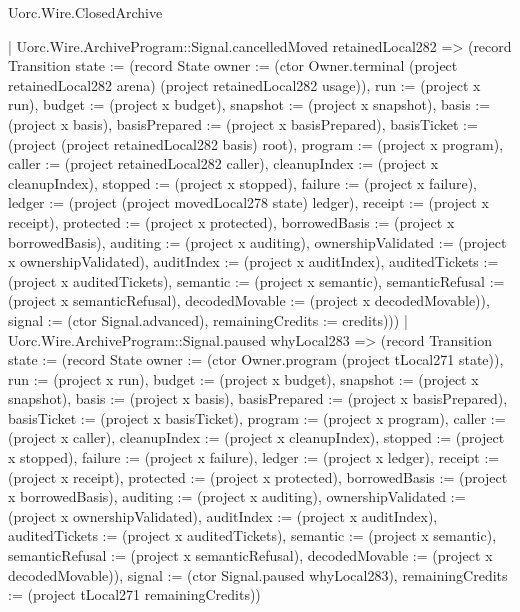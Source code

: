 \begin{lexlean}{Uorc.Wire.ClosedArchive}
\begin{semanticmodule}
{        | Uorc.Wire.ArchiveProgram::Signal.cancelledMoved retainedLocal282 => (record Transition {state := (record State {owner := (ctor Owner.terminal (project retainedLocal282 arena) (project retainedLocal282 usage)), run := (project x run), budget := (project x budget), snapshot := (project x snapshot), basis := (project x basis), basisPrepared := (project x basisPrepared), basisTicket := (project (project retainedLocal282 basis) root), program := (project x program), caller := (project retainedLocal282 caller), cleanupIndex := (project x cleanupIndex), stopped := (project x stopped), failure := (project x failure), ledger := (project (project movedLocal278 state) ledger), receipt := (project x receipt), protected := (project x protected), borrowedBasis := (project x borrowedBasis), auditing := (project x auditing), ownershipValidated := (project x ownershipValidated), auditIndex := (project x auditIndex), auditedTickets := (project x auditedTickets), semantic := (project x semantic), semanticRefusal := (project x semanticRefusal), decodedMovable := (project x decodedMovable)}), signal := (ctor Signal.advanced), remainingCredits := credits})))
      | Uorc.Wire.ArchiveProgram::Signal.paused whyLocal283 => (record Transition {state := (record State {owner := (ctor Owner.program (project tLocal271 state)), run := (project x run), budget := (project x budget), snapshot := (project x snapshot), basis := (project x basis), basisPrepared := (project x basisPrepared), basisTicket := (project x basisTicket), program := (project x program), caller := (project x caller), cleanupIndex := (project x cleanupIndex), stopped := (project x stopped), failure := (project x failure), ledger := (project x ledger), receipt := (project x receipt), protected := (project x protected), borrowedBasis := (project x borrowedBasis), auditing := (project x auditing), ownershipValidated := (project x ownershipValidated), auditIndex := (project x auditIndex), auditedTickets := (project x auditedTickets), semantic := (project x semantic), semanticRefusal := (project x semanticRefusal), decodedMovable := (project x decodedMovable)}), signal := (ctor Signal.paused whyLocal283), remainingCredits := (project tLocal271 remainingCredits)})
}
\end{semanticmodule}
\end{lexlean}
